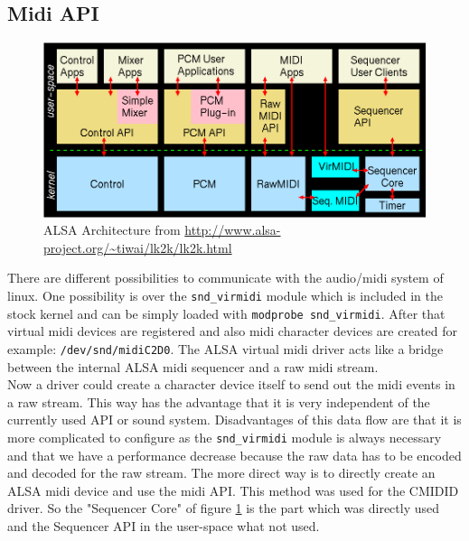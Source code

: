 \documentclass[paper=a4,fontsize=11pt,twocolumn,pagesize,bibtotoc]{scrartcl}
\begin{document}
\subsection{Midi API}
\begin{figure}
\includegraphics[keepaspectratio=true,width=\textwidth]{alsa.png}
\caption{ALSA Architecture from \url{http://www.alsa-project.org/~tiwai/lk2k/lk2k.html}}
\label{alsaarch}
\end{figure}
There are different possibilities to communicate with the audio/midi system of linux. One possibility is over the \texttt{snd\_virmidi} module which is included in the stock kernel and can be simply loaded with \texttt{modprobe snd\_virmidi}. After that virtual midi devices are registered and also midi character devices are created for example: \texttt{/dev/snd/midiC2D0}. The ALSA virtual midi driver acts like a bridge between the internal ALSA midi sequencer and a raw midi stream. \\
Now a driver could create a character device itself to send out the midi events in a raw stream. This way has the advantage that it is very independent of the currently used API or sound system. Disadvantages of this data flow are that it is more complicated to configure as the \texttt{snd\_virmidi} module is always necessary and that we have a performance decrease because the raw data has to be encoded and decoded for the raw stream. The more direct way is to directly create an ALSA midi device and use the midi API. This method was used for the CMIDID driver. So the "Sequencer Core" of figure \ref{alsaarch} is the part which was directly used and the Sequencer API in the user-space what not used.
\end{document}
